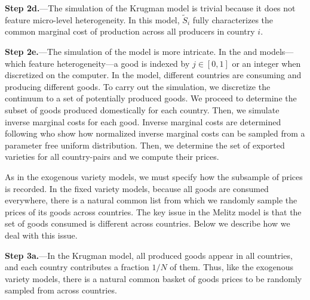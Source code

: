 \documentclass[12pt,dvips, ps2pdf]{article}
\begin{document}
\textbf{Step 2d.}---The simulation of the Krugman model is trivial because it does not feature micro-level heterogeneity. In this model, $\tilde S_i$ fully characterizes the common marginal cost of production across all producers in country $i$.


\textbf{Step 2e.}---The simulation of the \citet{mel03} model is more intricate. In the \citet{ek02} and \citet{bejk03} models---which feature heterogeneity---a good is indexed by $j\in[0,1]$ or an integer when discretized on the computer. In the \citet{mel03} model, different countries are consuming and producing different goods. To carry out the simulation, we discretize the continuum to a set of potentially produced goods. We proceed to determine the subset of goods produced domestically for each country. Then, we simulate inverse marginal costs for each good. Inverse marginal costs are determined following \citet{ekk08} who show how normalized inverse marginal costs can be sampled from a parameter free uniform distribution. Then, we determine the set of exported varieties for all country-pairs and we compute their prices.

As in the exogenous variety models, we must specify how the subsample of prices is recorded. In the fixed variety models, because all goods are consumed everywhere, there is a natural common list from which we randomly sample the prices of its goods across countries. The key issue in the Melitz model is that the set of goods consumed is different across countries. Below we describe how we deal with this issue.

\textbf{Step 3a.}---In the Krugman model, all produced goods appear in all countries, and each country contributes a fraction $1/N$ of them. Thus, like the exogenous variety models, there is a natural common basket of goods prices to be randomly sampled from across countries.
\end{document}
